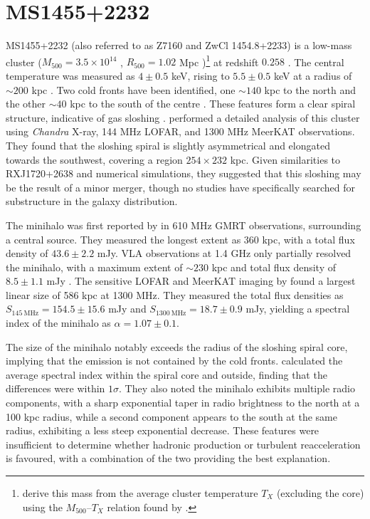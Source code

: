 \FloatBarrier

\section{MS1455+2232}
\label{sec:ms1455+2232}
MS1455+2232 (also referred to as Z7160 and ZwCl 1454.8+2233) is a low-mass cluster ($M_{500}=3.5\times10^{14}$ \Msun{}, $R_{500}=1.02$ Mpc \citep{Giacintucci2017})\footnote{\citet{Giacintucci2017} derive this mass from the average cluster temperature $T_X$ (excluding the core) using the $M_{500}$--$T_X$ relation found by \citet{Vikhlinin2009}.} at redshift $0.258$ \citep{Wen2015}. The central temperature was measured as $4\pm0.5$ keV, rising to $5.5\pm0.5$ keV at a radius of $\sim\!200$ kpc \citep{Mazzotta2001-2}. Two cold fronts have been identified, one $\sim\!140$ kpc to the north and the other $\sim\!40$ kpc to the south of the centre \citep{Mazotta2008}. These features form a clear spiral structure, indicative of gas sloshing \citep{Mazotta2008}. \citet{Riseley2022} performed a detailed analysis of this cluster using \textit{Chandra} X-ray, 144 MHz LOFAR, and 1300 MHz MeerKAT observations. They found that the sloshing spiral is slightly asymmetrical and elongated towards the southwest, covering a region $254\times232$ kpc. Given similarities to RXJ1720+2638 and numerical simulations, they suggested that this sloshing may be the result of a minor merger, though no studies have specifically searched for substructure in the galaxy distribution. 

The minihalo was first reported by \citet{Venturi2008} in 610 MHz GMRT observations, surrounding a central source. They measured the longest extent as 360 kpc, with a total flux density of $43.6\pm2.2$ mJy. VLA observations at 1.4 GHz only partially resolved the minihalo, with a maximum extent of $\sim\!230$ kpc and total flux density of $8.5\pm1.1$ mJy \citep{Giacintucci2019}. The sensitive LOFAR and MeerKAT imaging by \citet{Riseley2022} found a largest linear size of 586 kpc at 1300 MHz. They measured the total flux densities as $S_{145\> \text{MHz}} = 154.5\pm15.6$ mJy and $S_{1300\> \text{MHz}} = 18.7\pm0.9$ mJy, yielding a spectral index of the minihalo as $\alpha = 1.07\pm0.1$. 

The size of the minihalo notably exceeds the radius of the sloshing spiral core, implying that the emission is not contained by the cold fronts. \citet{Riseley2022} calculated the average spectral index within the spiral core and outside, finding that the differences were within $1\sigma$. They also noted the minihalo exhibits multiple radio components, with a sharp exponential taper in radio brightness to the north at a 100 kpc radius, while a second component appears to the south at the same radius, exhibiting a less steep exponential decrease. These features were insufficient to determine whether hadronic production or turbulent reacceleration is favoured, with a combination of the two providing the best explanation. 

